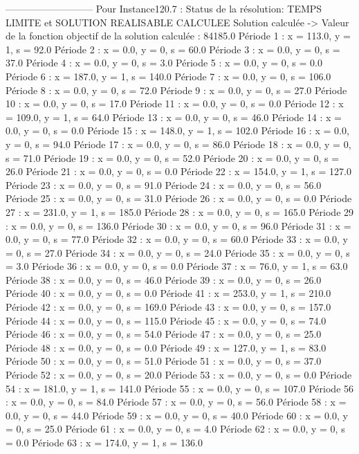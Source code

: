 ---------------------------
Pour Instance120.7 :
Status de la résolution: TEMPS LIMITE et SOLUTION REALISABLE CALCULEE
Solution calculée
-> Valeur de la fonction objectif de la solution calculée :  84185.0
Période 1 : x = 113.0, y = 1, s = 92.0
Période 2 : x = 0.0, y = 0, s = 60.0
Période 3 : x = 0.0, y = 0, s = 37.0
Période 4 : x = 0.0, y = 0, s = 3.0
Période 5 : x = 0.0, y = 0, s = 0.0
Période 6 : x = 187.0, y = 1, s = 140.0
Période 7 : x = 0.0, y = 0, s = 106.0
Période 8 : x = 0.0, y = 0, s = 72.0
Période 9 : x = 0.0, y = 0, s = 27.0
Période 10 : x = 0.0, y = 0, s = 17.0
Période 11 : x = 0.0, y = 0, s = 0.0
Période 12 : x = 109.0, y = 1, s = 64.0
Période 13 : x = 0.0, y = 0, s = 46.0
Période 14 : x = 0.0, y = 0, s = 0.0
Période 15 : x = 148.0, y = 1, s = 102.0
Période 16 : x = 0.0, y = 0, s = 94.0
Période 17 : x = 0.0, y = 0, s = 86.0
Période 18 : x = 0.0, y = 0, s = 71.0
Période 19 : x = 0.0, y = 0, s = 52.0
Période 20 : x = 0.0, y = 0, s = 26.0
Période 21 : x = 0.0, y = 0, s = 0.0
Période 22 : x = 154.0, y = 1, s = 127.0
Période 23 : x = 0.0, y = 0, s = 91.0
Période 24 : x = 0.0, y = 0, s = 56.0
Période 25 : x = 0.0, y = 0, s = 31.0
Période 26 : x = 0.0, y = 0, s = 0.0
Période 27 : x = 231.0, y = 1, s = 185.0
Période 28 : x = 0.0, y = 0, s = 165.0
Période 29 : x = 0.0, y = 0, s = 136.0
Période 30 : x = 0.0, y = 0, s = 96.0
Période 31 : x = 0.0, y = 0, s = 77.0
Période 32 : x = 0.0, y = 0, s = 60.0
Période 33 : x = 0.0, y = 0, s = 27.0
Période 34 : x = 0.0, y = 0, s = 24.0
Période 35 : x = 0.0, y = 0, s = 3.0
Période 36 : x = 0.0, y = 0, s = 0.0
Période 37 : x = 76.0, y = 1, s = 63.0
Période 38 : x = 0.0, y = 0, s = 46.0
Période 39 : x = 0.0, y = 0, s = 26.0
Période 40 : x = 0.0, y = 0, s = 0.0
Période 41 : x = 253.0, y = 1, s = 210.0
Période 42 : x = 0.0, y = 0, s = 169.0
Période 43 : x = 0.0, y = 0, s = 157.0
Période 44 : x = 0.0, y = 0, s = 115.0
Période 45 : x = 0.0, y = 0, s = 74.0
Période 46 : x = 0.0, y = 0, s = 54.0
Période 47 : x = 0.0, y = 0, s = 25.0
Période 48 : x = 0.0, y = 0, s = 0.0
Période 49 : x = 127.0, y = 1, s = 83.0
Période 50 : x = 0.0, y = 0, s = 51.0
Période 51 : x = 0.0, y = 0, s = 37.0
Période 52 : x = 0.0, y = 0, s = 20.0
Période 53 : x = 0.0, y = 0, s = 0.0
Période 54 : x = 181.0, y = 1, s = 141.0
Période 55 : x = 0.0, y = 0, s = 107.0
Période 56 : x = 0.0, y = 0, s = 84.0
Période 57 : x = 0.0, y = 0, s = 56.0
Période 58 : x = 0.0, y = 0, s = 44.0
Période 59 : x = 0.0, y = 0, s = 40.0
Période 60 : x = 0.0, y = 0, s = 25.0
Période 61 : x = 0.0, y = 0, s = 4.0
Période 62 : x = 0.0, y = 0, s = 0.0
Période 63 : x = 174.0, y = 1, s = 136.0
